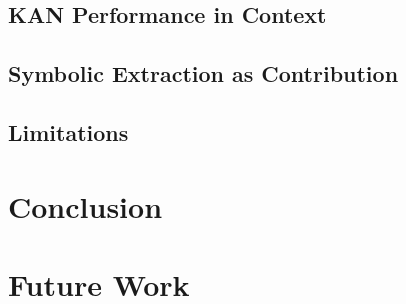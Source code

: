 \documentclass[12pt,a4paper,oneside]{article}
\begin{document}
\subsection{KAN Performance in Context}\label{subsec:disc_kan}

\subsection{Symbolic Extraction as Contribution}\label{subsec:disc_symbolic}

\subsection{Limitations}\label{subsec:disc_limitations}


\newpage
\section{Conclusion}\label{sec:conclusion}



\newpage
\section{Future Work}\label{sec:future}

%
\end{document}

